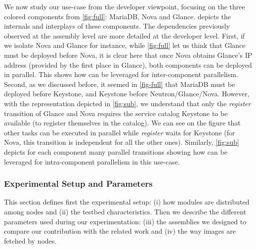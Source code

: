 We now study our use-case from the developer viewpoint, focusing on the three
colored components from \cref{fig:full}: MariaDB, Nova and Glance.
 depicts the internals and interplays of these components.
%
The dependencies previously observed at the assembly level are more
detailed at the developer level.
First, if we isolate Nova and Glance for instance, while \cref{fig:full} let us
think that Glance must be deployed before Nova, it is clear here that once Nova
obtains Glance's IP address (provided by the first place in Glance), both
components can be deployed in parallel. This shows how \mad can be leveraged for
inter-component parallelism.
Second, as we discussed before, it seemed in \cref{fig-full} that
MariaDB must be deployed before Keystone, and Keystone before
Neutron/Glance/Nova. However, with the \mad representation depicted in
\cref{fig:sub}, we understand that only the \emph{register} transition of Glance
and Nova requires the service catalog Keystone to be available (\ie to register
themselves in the catalog). We can see on the figure that other tasks can be
executed in parallel while \emph{register} waits for Keystone (\eg for Nova,
this transition is independent for all the other ones). Similarly,
\cref{fig:sub} depicts for each component many parallel transitions showing how
\mad can be leveraged for intra-component parallelism in this use-case.

\subsubsection{Experimental Setup and Parameters}
This section defines first the experimental setup: (i) how modules are
distributed among nodes and (ii) the testbed characteristics. Then we describe
the different parameters used during our experimentation: (iii) the assemblies
we designed to compare our contribution with the related work and (iv) the way
\docker images are fetched by nodes.

